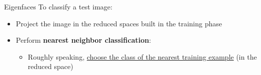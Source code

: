 \begin{frame}{Eigenfaces}
To classify a test image:
\begin{itemize}
\item Project the image in the reduced spaces built in the training phase
\item Perform \textbf{nearest neighbor classification}:
\begin{itemize}
\item Roughly speaking, \underline{choose the class of the nearest training example} (in the reduced space)
\end{itemize}
\end{itemize}
\end{frame}